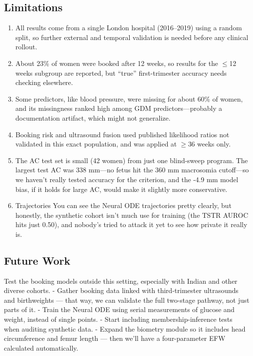 \documentclass[conference]{IEEEtran}
\begin{document}
\subsection{Limitations}

\begin{enumerate}

\item All results come from a single London hospital (2016--2019) using a random split, so further external and temporal validation is needed before any clinical rollout.

\item About 23\% of women were booked after 12 weeks, so results for the \ensuremath{\leq}12 weeks subgroup are reported, but ``true'' first-trimester accuracy needs checking elsewhere.

\item Some predictors, like blood pressure, were missing for about 60\% of women, and its missingness ranked high among GDM predictors---probably a documentation artifact, which might not generalize.

\item Booking risk and ultrasound fusion used published likelihood ratios not validated in this exact population, and was applied at \ensuremath{\geq}36 weeks only.

\item The AC test set is small (42 women) from just one blind-sweep program. The largest test AC was 338 mm---no fetus hit the 360 mm macrosomia cutoff---so we haven't really tested accuracy for the criterion, and the -4.9 mm model bias, if it holds for large AC, would make it slightly more conservative.

\item Trajectories You can see the Neural ODE trajectories pretty clearly, but honestly, the synthetic cohort isn't much use for training (the TSTR AUROC hits just 0.50), and nobody's tried to attack it yet to see how private it really is.

\end{enumerate}

\subsection{Future Work}

Test the booking models outside this setting, especially with Indian and other diverse cohorts. - Gather booking data linked with third-trimester ultrasounds and birthweights --- that way, we can validate the full two-stage pathway, not just parts of it. - Train the Neural ODE using serial measurements of glucose and weight, instead of single points. - Start including membership-inference tests when auditing synthetic data. - Expand the biometry module so it includes head circumference and femur length --- then we'll have a four-parameter EFW calculated automatically.
\end{document}
